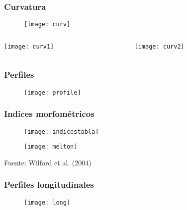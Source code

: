 \documentclass[14pt]{beamer}
\begin{document}
\begin{frame}
\frametitle{Curvatura}
  \begin{figure}
    \centering
    \texttt{[image: curv]}
  \end{figure}
\end{frame}
\begin{frame}
\begin{columns}
		\begin{column}{.50\linewidth}
		 \texttt{[image: curv1]}
		\end{column}
		\begin{column}{.50\linewidth}
			 \texttt{[image: curv2]}
		\end{column}
	\end{columns}
\end{frame}
\begin{frame}
\frametitle{Perfiles}
  \begin{figure}
    \centering
    \texttt{[image: profile]}
  \end{figure}
\end{frame}
\begin{frame}
\frametitle{Indices morfométricos}
  \begin{figure}
    \centering
    \texttt{[image: indicestabla]}
  \end{figure}
\end{frame}
\begin{frame}
  \begin{figure}
    \centering
    \texttt{[image: melton]}
  \end{figure}
\tiny{Fuente: Wilford et al. (2004)}
\end{frame}
\begin{frame}
\frametitle{Perfiles longitudinales}
  \begin{figure}
    \centering
    \texttt{[image: long]}
  \end{figure}
\tiny{}
\end{frame}
\end{document}
